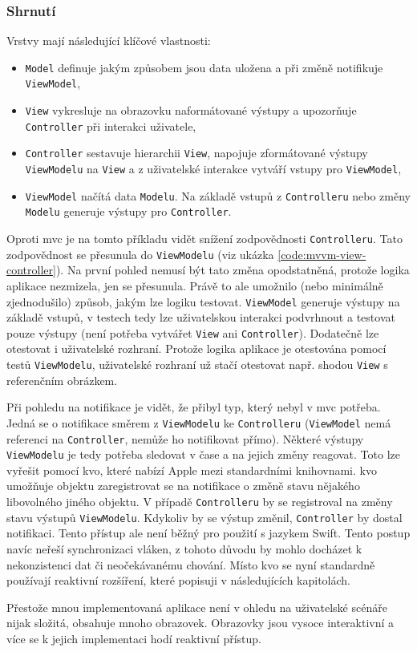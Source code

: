 \subsubsection*{Shrnutí} \label{architektura-mvvm-shrnuti}

Vrstvy mají následující klíčové vlastnosti:
\begin{itemize}
  \item \texttt{Model} definuje jakým způsobem jsou data uložena a při změně notifikuje \texttt{ViewModel},
  \item \texttt{View} vykresluje na obrazovku naformátované výstupy a upozorňuje \texttt{Controller} při interakci uživatele,
  \item \texttt{Controller} sestavuje hierarchii \texttt{View}, napojuje zformátované výstupy \texttt{ViewModelu} na \texttt{View} a z uživatelské interakce vytváří vstupy pro \texttt{ViewModel},
  \item \texttt{ViewModel} načítá data \texttt{Modelu}. Na základě vstupů z \texttt{Controlleru} nebo změny \texttt{Modelu} generuje výstupy pro \texttt{Controller}.
\end{itemize}

Oproti \acrshort{mvc} je na tomto příkladu vidět snížení zodpovědnosti \texttt{Controlleru}.
Tato zodpovědnost se přesunula do \texttt{ViewModelu} (viz ukázka \ref{code:mvvm-view-controller}).
Na první pohled nemusí být tato změna opodstatněná, protože logika aplikace nezmizela, jen se přesunula.
Právě to ale umožnilo (nebo minimálně zjednodušilo) způsob, jakým lze logiku testovat.
\texttt{ViewModel} generuje výstupy na základě vstupů, v testech tedy lze uživatelskou interakci podvrhnout a testovat pouze výstupy (není potřeba vytvářet \texttt{View} ani \texttt{Controller}).
Dodatečně lze otestovat i uživatelské rozhraní.
Protože logika aplikace je otestována pomocí testů \texttt{ViewModelu}, uživatelské rozhraní už stačí otestovat např. shodou \texttt{View} s referenčním obrázkem.


Při pohledu na notifikace je vidět, že přibyl typ, který nebyl v \acrshort{mvc} potřeba.
Jedná se o notifikace směrem z \texttt{ViewModelu} ke \texttt{Controlleru} (\texttt{ViewModel} nemá referenci na \texttt{Controller}, nemůže ho notifikovat přímo).
Některé výstupy \texttt{ViewModelu} je tedy potřeba sledovat v čase a na jejich změny reagovat.
Toto lze vyřešit pomocí \acrfull{kvo}, které nabízí Apple mezi standardními knihovnami.
\acrshort{kvo} umožňuje objektu zaregistrovat se na notifikace o změně stavu nějakého libovolného jiného objektu.
V případě \texttt{Controlleru} by se registroval na změny stavu výstupů \texttt{ViewModelu}.
Kdykoliv by se výstup změnil, \texttt{Controller} by dostal notifikaci.
Tento přístup ale není běžný pro použití s jazykem Swift.
Tento postup navíc neřeší synchronizaci vláken, z tohoto důvodu by mohlo docházet k nekonzistenci dat či neočekávanému chování.
Místo \acrshort{kvo} se nyní standardně používají reaktivní rozšíření, které popisuji v následujících kapitolách.

Přestože mnou implementovaná aplikace není v ohledu na uživatelské scénáře nijak složitá, obsahuje mnoho obrazovek.
Obrazovky jsou vysoce interaktivní a více se k jejich implementaci hodí reaktivní přístup.
